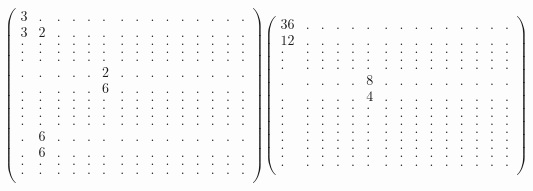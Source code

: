 \documentclass[12pt,a4paper]{amsart}
\begin{document}
\begin{align*}
\left(\begin{array}{rrrrrrrrrrrrrrr}%
3&.&.&.&.&.&.&.&.&.&.&.&.&.&.\\%
3&2&.&.&.&.&.&.&.&.&.&.&.&.&.\\%
.&.&.&.&.&.&.&.&.&.&.&.&.&.&.\\%
.&.&.&.&.&.&.&.&.&.&.&.&.&.&.\\%
.&.&.&.&.&.&.&.&.&.&.&.&.&.&.\\%
.&.&.&.&.&2&.&.&.&.&.&.&.&.&.\\%
.&.&.&.&.&6&.&.&.&.&.&.&.&.&.\\%
.&.&.&.&.&.&.&.&.&.&.&.&.&.&.\\%
.&.&.&.&.&.&.&.&.&.&.&.&.&.&.\\%
.&.&.&.&.&.&.&.&.&.&.&.&.&.&.\\%
.&.&.&.&.&.&.&.&.&.&.&.&.&.&.\\%
.&6&.&.&.&.&.&.&.&.&.&.&.&.&.\\%
.&6&.&.&.&.&.&.&.&.&.&.&.&.&.\\%
.&.&.&.&.&.&.&.&.&.&.&.&.&.&.\\%
.&.&.&.&.&.&.&.&.&.&.&.&.&.&.\\%
\end{array}\right)%
\left(\begin{array}{rrrrrrrrrrrrrrr}%
36&.&.&.&.&.&.&.&.&.&.&.&.&.&.\\%
12&.&.&.&.&.&.&.&.&.&.&.&.&.&.\\%
.&.&.&.&.&.&.&.&.&.&.&.&.&.&.\\%
.&.&.&.&.&.&.&.&.&.&.&.&.&.&.\\%
.&.&.&.&.&.&.&.&.&.&.&.&.&.&.\\%
.&.&.&.&.&8&.&.&.&.&.&.&.&.&.\\%
.&.&.&.&.&4&.&.&.&.&.&.&.&.&.\\%
.&.&.&.&.&.&.&.&.&.&.&.&.&.&.\\%
.&.&.&.&.&.&.&.&.&.&.&.&.&.&.\\%
.&.&.&.&.&.&.&.&.&.&.&.&.&.&.\\%
.&.&.&.&.&.&.&.&.&.&.&.&.&.&.\\%
.&.&.&.&.&.&.&.&.&.&.&.&.&.&.\\%
.&.&.&.&.&.&.&.&.&.&.&.&.&.&.\\%
.&.&.&.&.&.&.&.&.&.&.&.&.&.&.\\%
.&.&.&.&.&.&.&.&.&.&.&.&.&.&.\\%
\end{array}\right)%
\end{align*}
\end{document}
